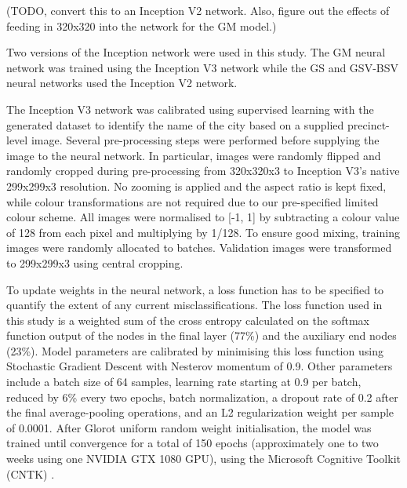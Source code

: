 \documentclass[10pt,letterpaper]{article}
\begin{document}

(TODO, convert this to an Inception V2 network. Also, figure out the effects of feeding in 320x320 into the network for the GM model.)

Two versions of the Inception network were used in this study. The GM neural network was trained using the Inception V3 network while the GS and GSV-BSV neural networks used the Inception V2 network. 

The Inception V3 network was calibrated using supervised learning with the generated dataset to identify the name of the city based on a supplied precinct-level image. Several pre-processing steps were performed before supplying the image to the neural network. In particular, images were randomly flipped and randomly cropped during pre-processing from 320x320x3 to Inception V3's native 299x299x3 resolution. No zooming is applied and the aspect ratio is kept fixed, while colour transformations are not required due to our pre-specified limited colour scheme. All images were normalised to [-1, 1] by subtracting a colour value of 128 from each pixel and multiplying by 1/128. To ensure good mixing, training images were randomly allocated to batches. Validation images were transformed to 299x299x3 using central cropping.

To update weights in the neural network, a loss function has to be specified to quantify the extent of any current misclassifications. The loss function used in this study is a weighted sum of the cross entropy calculated on the softmax function output of the nodes in the final layer (77\%) and the auxiliary end nodes (23\%). Model parameters are calibrated by minimising this loss function using Stochastic Gradient Descent with Nesterov momentum of 0.9. Other parameters include a batch size of 64 samples, learning rate starting at 0.9 per batch, reduced by 6\% every two epochs, batch normalization, a dropout rate of 0.2 after the final average-pooling operations, and an L2 regularization weight per sample of 0.0001. After Glorot uniform random weight initialisation, the model was trained until convergence for a total of 150 epochs (approximately one to two weeks using one NVIDIA GTX 1080 GPU), using the Microsoft Cognitive Toolkit (CNTK) \cite{Yu2015}. 
\end{document}
